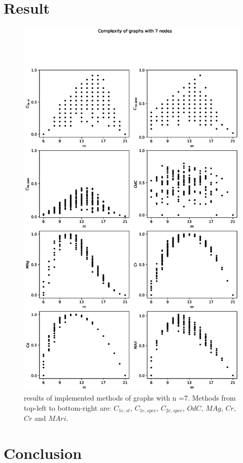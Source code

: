 \documentclass[12pt]{article}
\begin{document}
\section{Result}
\clearpage
\begin{figure}[ht]
    \includegraphics[width=\textwidth]{complexities.eps}
    \centering
    \caption{results of implemented methods of graphs with n =7. Methods from top-left to bottom-right are: $C_{1e,st}$, $C_{1e,spec}$, $C_{2e,spec}$, $OdC$, $MAg$, $Cr$, $Cr$ and $MAri$.}
\end{figure}
\section{Conclusion}

\printbibliography
\end{document}
